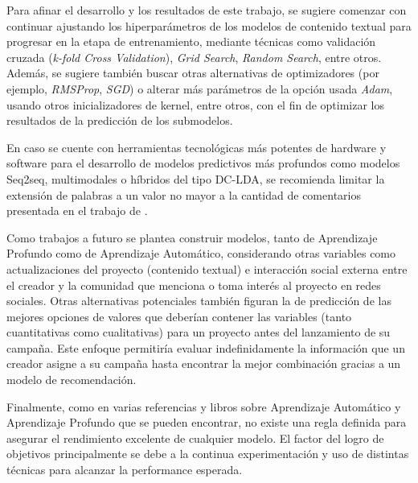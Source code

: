 Para afinar el desarrollo y los resultados de este trabajo, se sugiere comenzar con continuar ajustando los hiperparámetros de los modelos de contenido textual para progresar en la etapa de entrenamiento, mediante técnicas como validación cruzada (\textit{k-fold Cross Validation}), \textit{Grid Search}, \textit{Random Search}, entre otros. Además, se sugiere también buscar otras alternativas de optimizadores (por ejemplo, \textit{RMSProp}, \textit{SGD}) o alterar más parámetros de la opción usada \textit{Adam}, usando otros inicializadores de kernel, entre otros, con el fin de optimizar los resultados de la predicción de los submodelos.

En caso se cuente con herramientas tecnológicas más potentes de hardware y software para el desarrollo de modelos predictivos más profundos como modelos Seq2seq, multimodales o híbridos del tipo DC-LDA, se recomienda limitar la extensión de palabras a un valor no mayor a la cantidad de comentarios presentada en el trabajo de \cite{pr_shafqat2019topicpredictions}.

Como trabajos a futuro se plantea construir modelos, tanto de Aprendizaje Profundo como de Aprendizaje Automático, considerando otras variables como actualizaciones del proyecto (contenido textual) e interacción social externa entre el creador y la comunidad que menciona o toma interés al proyecto en redes sociales. Otras alternativas potenciales también figuran la de predicción de las mejores opciones de valores que deberían contener las variables (tanto cuantitativas como cualitativas) para un proyecto antes del lanzamiento de su campaña. Este enfoque permitiría evaluar indefinidamente la información que un creador asigne a su campaña hasta encontrar la mejor combinación gracias a un modelo de recomendación.

Finalmente, como en varias referencias y libros sobre Aprendizaje Automático y Aprendizaje Profundo que se pueden encontrar, no existe una regla definida para asegurar el rendimiento excelente de cualquier modelo. El factor del logro de objetivos principalmente se debe a la continua experimentación y uso de distintas técnicas para alcanzar la performance esperada.
